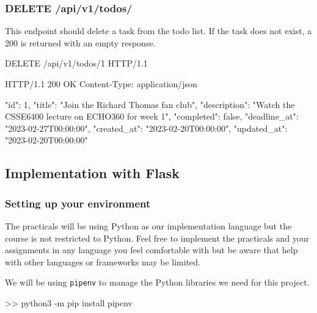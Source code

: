 \documentclass{csse4400}
\begin{document}
\subsubsection{DELETE /api/v1/todos/}
This endpoint should delete a task from the todo list.
If the task does not exist, a 200 is returned with an empty response.

\begin{code}[language=json,numbers=none]{}
DELETE /api/v1/todos/1 HTTP/1.1
\end{code}
\begin{code}[language=json,numbers=none]{}
HTTP/1.1 200 OK
Content-Type: application/json

{
    "id": 1,
    "title": "Join the Richard Thomas fan club",
    "description": "Watch the CSSE6400 lecture on ECHO360 for week 1",
    "completed": false,
    "deadline_at": "2023-02-27T00:00:00",
    "created_at": "2023-02-20T00:00:00",
    "updated_at": "2023-02-20T00:00:00"
}
\end{code}


\subsection{Implementation with Flask}

\subsubsection{Setting up your environment}

The practicals will be using Python as our implementation language but the course is not restricted to Python.
Feel free to implement the practicals and your assignments in any language you feel comfortable with but be aware that help with other languages or frameworks may be limited.



We will be using \texttt{pipenv} to manage the Python libraries we need for this project.

\begin{code}[language=bash,numbers=none]{}
  >> python3 -m pip install pipenv
\end{code}
\end{document}
